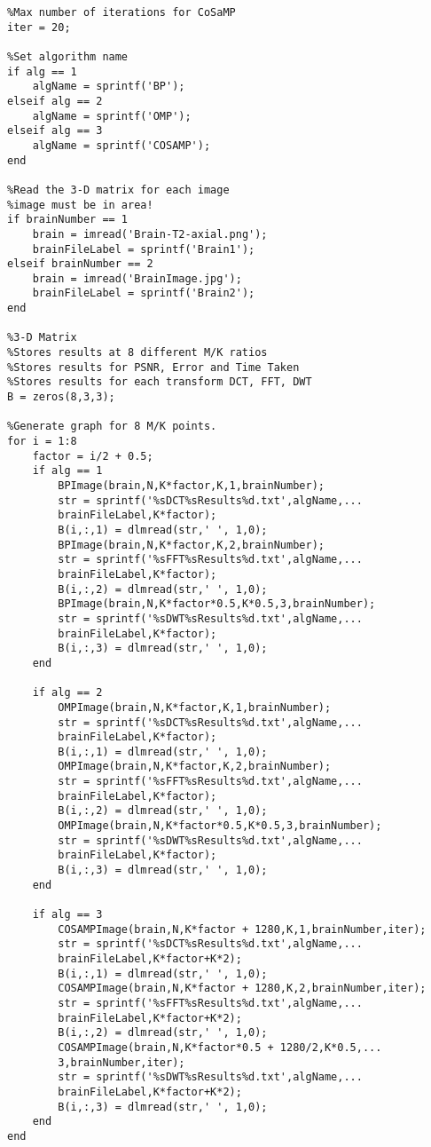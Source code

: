 \documentclass[titlepage,oneside, 12pt]{book}
\theoremstyle{break}
\begin{document}
\begin{appendices}
\begin{lstlisting}
%Max number of iterations for CoSaMP
iter = 20;

%Set algorithm name
if alg == 1
    algName = sprintf('BP');
elseif alg == 2
    algName = sprintf('OMP');
elseif alg == 3
    algName = sprintf('COSAMP');
end

%Read the 3-D matrix for each image
%image must be in area!
if brainNumber == 1
    brain = imread('Brain-T2-axial.png');
    brainFileLabel = sprintf('Brain1');
elseif brainNumber == 2
    brain = imread('BrainImage.jpg');
    brainFileLabel = sprintf('Brain2');
end

%3-D Matrix
%Stores results at 8 different M/K ratios
%Stores results for PSNR, Error and Time Taken
%Stores results for each transform DCT, FFT, DWT
B = zeros(8,3,3);

%Generate graph for 8 M/K points. 
for i = 1:8
    factor = i/2 + 0.5;
    if alg == 1
        BPImage(brain,N,K*factor,K,1,brainNumber);
        str = sprintf('%sDCT%sResults%d.txt',algName,...
        brainFileLabel,K*factor);
        B(i,:,1) = dlmread(str,' ', 1,0);
        BPImage(brain,N,K*factor,K,2,brainNumber);
        str = sprintf('%sFFT%sResults%d.txt',algName,...
        brainFileLabel,K*factor);
        B(i,:,2) = dlmread(str,' ', 1,0);
        BPImage(brain,N,K*factor*0.5,K*0.5,3,brainNumber);
        str = sprintf('%sDWT%sResults%d.txt',algName,...
        brainFileLabel,K*factor);
        B(i,:,3) = dlmread(str,' ', 1,0);
    end
    
    if alg == 2
        OMPImage(brain,N,K*factor,K,1,brainNumber);
        str = sprintf('%sDCT%sResults%d.txt',algName,...
        brainFileLabel,K*factor);
        B(i,:,1) = dlmread(str,' ', 1,0);
        OMPImage(brain,N,K*factor,K,2,brainNumber);
        str = sprintf('%sFFT%sResults%d.txt',algName,...
        brainFileLabel,K*factor);
        B(i,:,2) = dlmread(str,' ', 1,0);
        OMPImage(brain,N,K*factor*0.5,K*0.5,3,brainNumber);
        str = sprintf('%sDWT%sResults%d.txt',algName,...
        brainFileLabel,K*factor);
        B(i,:,3) = dlmread(str,' ', 1,0);
    end
    
    if alg == 3
        COSAMPImage(brain,N,K*factor + 1280,K,1,brainNumber,iter);
        str = sprintf('%sDCT%sResults%d.txt',algName,...
        brainFileLabel,K*factor+K*2);
        B(i,:,1) = dlmread(str,' ', 1,0);
        COSAMPImage(brain,N,K*factor + 1280,K,2,brainNumber,iter);
        str = sprintf('%sFFT%sResults%d.txt',algName,...
        brainFileLabel,K*factor+K*2);
        B(i,:,2) = dlmread(str,' ', 1,0);
        COSAMPImage(brain,N,K*factor*0.5 + 1280/2,K*0.5,...
        3,brainNumber,iter);
        str = sprintf('%sDWT%sResults%d.txt',algName,...
        brainFileLabel,K*factor+K*2);
        B(i,:,3) = dlmread(str,' ', 1,0);
    end
end


\end{lstlisting}
\end{appendices}
\end{document}
